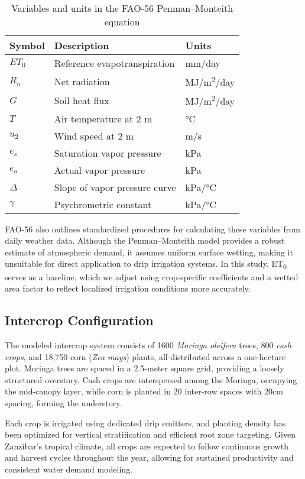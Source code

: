 \documentclass[twocolumn]{article}
\begin{document}
\begin{table}[h]
\centering
\caption{Variables and units in the FAO-56 Penman--Monteith equation}
\label{tab:et-vars}
\begin{tabular}{@{} l l l @{}}
\toprule
\textbf{Symbol} & \textbf{Description} & \textbf{Units} \\
\midrule
$ET_0$ & Reference evapotranspiration & mm/day \\
$R_n$  & Net radiation & MJ/m\textsuperscript{2}/day \\
$G$    & Soil heat flux & MJ/m\textsuperscript{2}/day \\
$T$    & Air temperature at 2 m & °C \\
$u_2$  & Wind speed at 2 m & m/s \\
$e_s$  & Saturation vapor pressure & kPa \\
$e_a$  & Actual vapor pressure & kPa \\
$\Delta$ & Slope of vapor pressure curve & kPa/°C \\
$\gamma$ & Psychrometric constant & kPa/°C \\
\bottomrule
\end{tabular}
\end{table}

FAO-56 also outlines standardized procedures for calculating these variables from daily weather data. Although the Penman--Monteith model provides a robust estimate of atmospheric demand, it assumes uniform surface wetting, making it unsuitable for direct application to drip irrigation systems. In this study, ET\textsubscript{0} serves as a baseline, which we adjust using crop-specific coefficients and a wetted area factor to reflect localized irrigation conditions more accurately.

\subsection{Intercrop Configuration}

The modeled intercrop system consists of 1600 \textit{Moringa oleifera} trees, 800 \textit{cash crops}, and 18,750 corn (\textit{Zea mays}) plants, all distributed across a one-hectare plot. Moringa trees are spaced in a 2.5-meter square grid, providing a loosely structured overstory. Cash crops are interspersed among the Moringa, occupying the mid-canopy layer, while corn is planted in 20 inter-row spaces with 20cm spacing, forming the understory.

Each crop is irrigated using dedicated drip emitters, and planting density has been optimized for vertical stratification and efficient root zone targeting. Given Zanzibar’s tropical climate, all crops are expected to follow continuous growth and harvest cycles throughout the year, allowing for sustained productivity and consistent water demand modeling.
\end{document}
